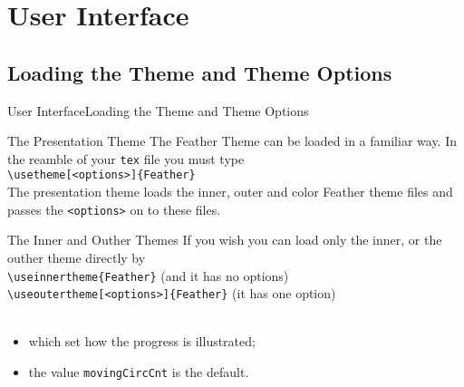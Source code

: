 \documentclass[aspectratio=169]{beamer}
\begin{document}
\section{User Interface}
\subsection{Loading the Theme and Theme Options}
\begin{frame}{User Interface}{Loading the Theme and Theme Options}

  \begin{block}{The Presentation Theme}
    The Feather Theme can be loaded in a familiar way. In the reamble of your {\tt tex} file you must type\\ \vspace{5pt} 
    {\tt \textbackslash usetheme[<options>]\{Feather\}}\\ \vspace{5pt} 
    The presentation theme loads the inner, outer and color Feather theme files and passes the {\tt <options>} on to these files.
  \end{block}
  \begin{block}{The Inner and Outher Themes}
    If you wish you can load only the inner, or the outher theme directly by\\ \vspace{5pt} 
    {\tt \textbackslash useinnertheme\{Feather\}} (and it has no options)\\ \vspace{5pt} 
    {\tt \textbackslash useoutertheme[<options>]\{Feather\}} (it has one option)\\
     \\
    \begin{itemize}
    \item which set how the progress is illustrated;
    \item the value {\tt movingCircCnt} is the default.
    \end{itemize}
  \end{block}
\end{frame}
\end{document}
